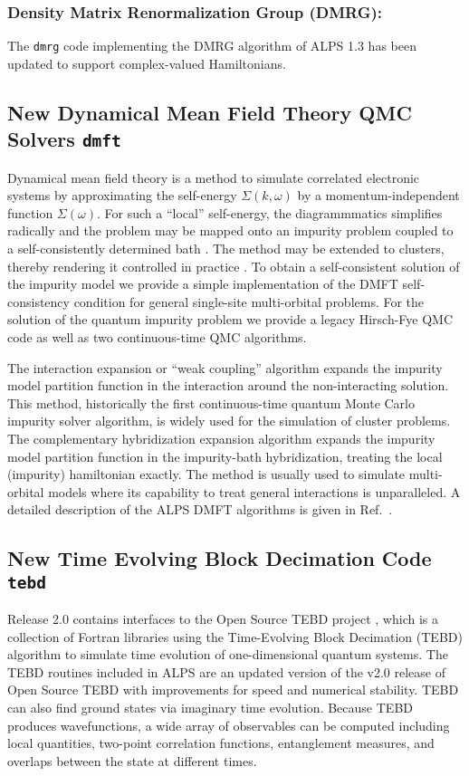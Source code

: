 \documentclass[12pt]{iopart}
\begin{document}
  
\subsubsection{Density Matrix Renormalization Group (DMRG):} The {\tt dmrg} code implementing the DMRG algorithm \cite{White1992,Schollwock2005}  of ALPS 1.3 has been updated to support complex-valued Hamiltonians.

\subsection{New Dynamical Mean Field Theory QMC Solvers {\tt dmft}}
Dynamical mean field theory is a method to simulate correlated electronic systems by approximating the self-energy $\Sigma(k,\omega)$ by a momentum-independent 
function $\Sigma(\omega)$. For such a ``local'' self-energy, the diagrammmatics simplifies radically and the  problem may be mapped onto an impurity problem
coupled to a self-consistently determined bath \cite{Georges96,Kotliar06}. The method may be extended to clusters, thereby rendering it controlled in practice \cite{Maier05}.
To obtain a self-consistent solution of the impurity model we provide a simple implementation of the DMFT self-consistency condition for general single-site multi-orbital problems.
For the solution of the quantum impurity problem we provide a legacy Hirsch-Fye QMC code \cite{Hirsch86} as well as two continuous-time QMC algorithms.

The interaction expansion or ``weak coupling'' algorithm \cite{Rubtsov04,Rubtsov05} expands the impurity model partition function in the interaction around the non-interacting solution. This method, historically
the first continuous-time quantum Monte Carlo impurity solver algorithm, is widely used for the simulation of cluster problems.
The complementary hybridization expansion algorithm \cite{Werner06,Werner06Kondo} expands the impurity model partition function in the impurity-bath hybridization, treating the local (impurity) hamiltonian exactly. 
The method is usually used to simulate multi-orbital models where its capability to treat general interactions is unparalleled. A detailed description of the ALPS DMFT algorithms is given in Ref.~\cite{ALPSDMFT}.

\subsection{New Time Evolving Block Decimation Code {\tt tebd}}
Release 2.0 contains interfaces to the Open Source TEBD project \cite{ostebd}, which is a collection of Fortran libraries using the Time-Evolving Block Decimation (TEBD) algorithm\cite{vidal1, vidal2} to simulate time evolution of one-dimensional quantum systems.  The TEBD routines included in ALPS are an updated version of the v2.0 release of Open Source TEBD with improvements for speed and numerical stability.  TEBD can also find ground states via imaginary time evolution.  Because TEBD produces wavefunctions, a wide array of observables can be computed including local quantities, two-point correlation functions, entanglement measures, and overlaps between the state at different times.
\end{document}
